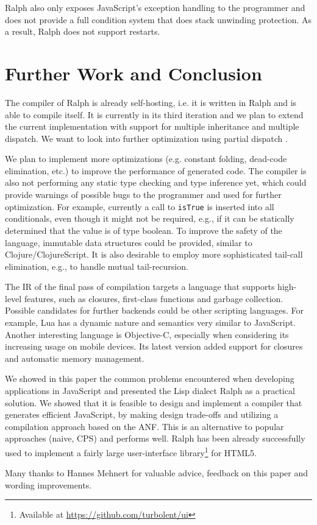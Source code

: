 \documentclass{acm_proc_article-sp}
\begin{document}
\vspace{-0.3em}
Ralph also only exposes JavaScript's exception handling to the
programmer and does not provide a full condition system that does
stack unwinding protection. As a result, Ralph does not support
restarts.


\section{Further Work and Conclusion}\label{sec:future}

The compiler of Ralph is already self-hosting, i.e. it is written in
Ralph and is able to compile itself. It is currently in its third
iteration and we plan to extend the current implementation with
support for multiple inheritance and multiple dispatch. We want to
look into further optimization using partial dispatch
\cite{bachrach99}.

\vspace{-0.3em}
We plan to implement more optimizations (e.g. constant folding,
dead-code elimination, etc.) to improve the performance of generated
code. The compiler is also not performing any static type checking and
type inference yet, which could provide warnings of possible bugs to
the programmer and used for further optimization. For example,
currently a call to \texttt{isTrue} is inserted into all conditionals,
even though it might not be required, e.g., if it can be statically
determined that the value is of type boolean. To improve the safety
of the language, immutable data structures could be provided, similar
to Clojure/ClojureScript. It is also desirable to employ more
sophisticated tail-call elimination, e.g., to handle mutual
tail-recursion.

\vspace{-0.3em}
The IR of the final pass of compilation targets a language that
supports high-level features, such as closures, first-class functions
and garbage collection. Possible candidates for further backends could
be other scripting languages. For example, Lua has a dynamic nature
and semantics very similar to JavaScript. Another interesting
language is Objective-C, especially when considering its increasing
usage on mobile devices. Its latest version added support for closures
and automatic memory management.

\vspace{-0.3em}
We showed in this paper the common problems encountered when
developing applications in JavaScript and presented the Lisp dialect
Ralph as a practical solution. We showed that it is feasible to design
and implement a compiler that generates efficient JavaScript, by
making design trade-offs and utilizing a compilation approach
based on the ANF. This is an alternative to popular approaches (naive,
CPS) and performs well. Ralph has  been already successfully used to
implement a fairly large user-interface library\footnote{Available at
  \url{https://github.com/turbolent/ui}} for HTML5.

Many thanks to Hannes Mehnert for valuable advice, feedback on this
paper and wording improvements.



\end{document}
